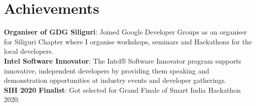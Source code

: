 \documentclass[letterpaper,11pt]{article}
\begin{document}
\section{Achievements}
 \begin{itemize}[leftmargin=0.15in, label={}]
    \small{\item{
     \textbf{Organiser of GDG Siliguri}{: Joined Google Developer Groups as an organiser for Siliguri Chapter where I organise workshops, seminars and Hackathons for the local developers.} \\
     \hfill \break
     \textbf{Intel Software Innovator}{: The Intel® Software Innovator program supports innovative, independent developers by providing them speaking and demonstration opportunities at industry events and developer gatherings.} \\
     \hfill \break
     \textbf{SIH 2020 Finalist}{: Got selected for Grand Finale of Smart India Hackathon 2020.} \\
    }}
 \end{itemize}
\end{document}
